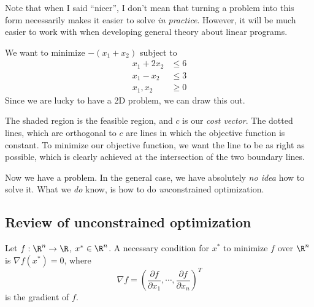 \documentclass[a4paper]{article}
\begin{document}
Note that when I said ``nicer'', I don't mean that turning a problem into this form necessarily makes it easier to solve \emph{in practice}. However, it will be much easier to work with when developing general theory about linear programs.

\begin{eg}
  We want to minimize $-(x_1 + x_2)$ subject to
  \begin{align*}
    x_1 + 2x_2 &\leq 6\\
    x_1 - x_2 &\leq 3\\
    x_1, x_2 &\geq 0
  \end{align*}
  Since we are lucky to have a 2D problem, we can draw this out.
  \begin{center}
  \end{center}
  The shaded region is the feasible region, and $c$ is our \emph{cost vector}. The dotted lines, which are orthogonal to $c$ are lines in which the objective function is constant. To minimize our objective function, we want the line to be as right as possible, which is clearly achieved at the intersection of the two boundary lines.
\end{eg}
Now we have a problem. In the general case, we have absolutely \emph{no idea} how to solve it. What we \emph{do} know, is how to do \emph{un}constrained optimization.

\subsection{Review of unconstrained optimization}
Let $f: \R^n \to \R$, $x^*\in \R^n$. A necessary condition for $x^*$ to minimize $f$ over $\R^n$ is $\nabla f(x^*) = 0$, where
\[
  \nabla f = \left(\frac{\partial f}{\partial x_1}, \cdots, \frac{\partial f}{\partial x_n}\right)^T
\]
is the gradient of $f$.
\end{document}
